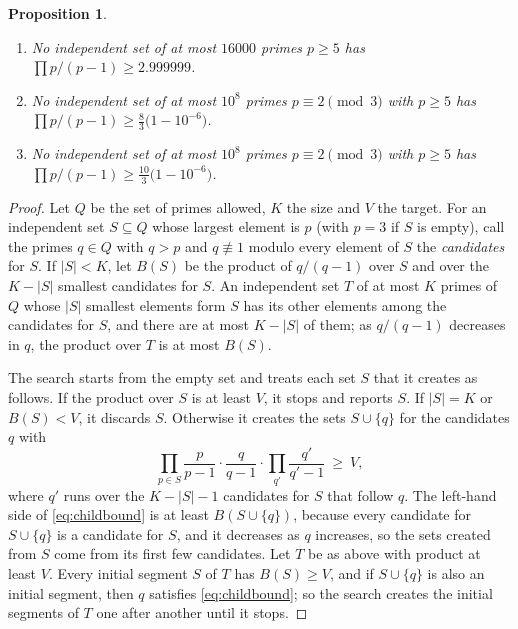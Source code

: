 \documentclass[11pt,reqno]{amsart}
\numberwithin{equation}{section}
\theoremstyle{plain}
\newtheorem{proposition}[theorem]{Proposition}
\theoremstyle{definition}
\theoremstyle{remark}
\begin{document}
\begin{proposition}\label{prop:indep}
\begin{enumerate}[label=\textup{(\roman*)}]
\item No independent set of at most $16000$ primes $p\ge5$ has
  $\prod p/(p-1)\ge2.999999$.
\item No independent set of at most $10^8$ primes $p\equiv2\pmod3$
  with $p\ge5$ has $\prod p/(p-1)\ge\frac83\bigl(1-10^{-6}\bigr)$.
\item No independent set of at most $10^8$ primes $p\equiv2\pmod3$
  with $p\ge5$ has $\prod p/(p-1)\ge\frac{10}3\bigl(1-10^{-6}\bigr)$.
\end{enumerate}
\end{proposition}

\begin{proof}
Let $Q$ be the set of primes allowed, $K$ the size and $V$ the target.
For an independent set $S\subseteq Q$ whose largest element is $p$
(with $p=3$ if $S$ is empty), call the primes $q\in Q$ with $q>p$ and
$q\not\equiv1$ modulo every element of $S$ the \emph{candidates} for
$S$. If $|S|<K$, let $B(S)$ be the product of $q/(q-1)$ over $S$ and
over the $K-|S|$ smallest candidates for $S$. An independent set $T$
of at most $K$ primes of $Q$ whose $|S|$ smallest elements form $S$
has its other elements among the candidates for $S$, and there are at
most $K-|S|$ of them; as $q/(q-1)$ decreases in $q$, the product over
$T$ is at most $B(S)$.

The search starts from the empty set and treats each set $S$ that it
creates as follows. If the product over $S$ is at least $V$, it stops
and reports $S$. If $|S|=K$ or $B(S)<V$, it discards $S$. Otherwise it
creates the sets $S\cup\{q\}$ for the candidates $q$ with
\begin{equation}\label{eq:childbound}
  \prod_{p\in S}\frac{p}{p-1}\cdot\frac{q}{q-1}\cdot
  \prod_{q'}\frac{q'}{q'-1}\ \ge\ V ,
\end{equation}
where $q'$ runs over the $K-|S|-1$ candidates for $S$ that follow $q$.
The left-hand side of \eqref{eq:childbound} is at least
$B(S\cup\{q\})$, because every candidate for $S\cup\{q\}$ is a
candidate for $S$, and it decreases as $q$ increases, so the sets
created from $S$ come from its first few candidates. Let $T$ be as
above with product at least $V$. Every initial segment $S$ of $T$ has
$B(S)\ge V$, and if $S\cup\{q\}$ is also an initial segment, then $q$
satisfies \eqref{eq:childbound}; so the search creates the initial
segments of $T$ one after another until it stops.


\end{proof}
\end{document}
